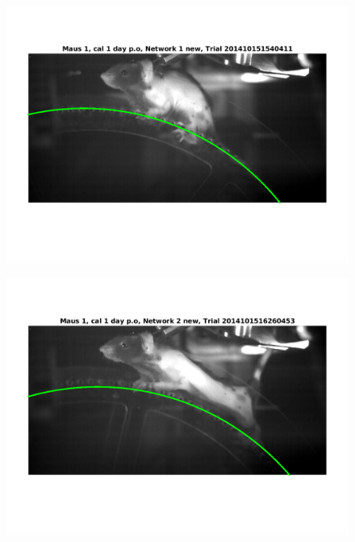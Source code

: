 \documentclass[
	fontsize=12pt,
	paper=a4,
	twoside=false,
	numbers=noenddot,
	plainheadsepline,
	toc=listof,
	toc=bibliography
]{scrartcl}
\begin{document}
\begin{figure} [htb]
	\centering
	\includegraphics[scale = 0.6]{images/mouse1/result_Maus_1_cal_1_day_Network_1_new.png}
\end{figure}
\begin{figure} [htb] \centering
	\includegraphics[scale = 0.6]{images/mouse1/result_Maus_1_cal_1_day_Network_2_new.png}
\end{figure}


\end{document}
